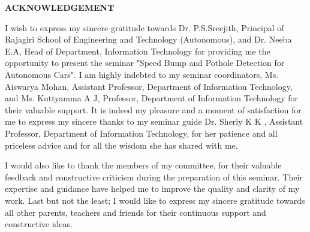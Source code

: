 \setsansfont[Ligatures=TeX]{Arial}

\begin{center}
    
    \textsf{\Huge \textbf{ACKNOWLEDGEMENT}
    }\\
    
\end{center}
\noindent
I wish to express my sincere gratitude towards Dr. P.S.Sreejith, Principal of Rajagiri School of Engineering and Technology (Autonomous), and Dr. Neeba E.A, Head of Department, Information Technology for providing me the opportunity to present the seminar "Speed Bump and Pothole Detection for Autonomous Cars". I am highly indebted to my seminar coordinators, Ms. Aiswarya Mohan, Assistant Professor, Department of Information Technology, and Ms. Kuttyamma A J,  Professor, Department of Information Technology for their valuable support. It is indeed my pleasure and a moment of satisfaction for me to express my sincere thanks to my seminar guide Dr. Sherly K K , Assistant Professor, Department of Information Technology, for her patience and all priceless advice and for all the wisdom she has shared with me. 
\par \noindent
I would also like to thank the members of my committee, for their valuable feedback and constructive criticism during the preparation of this seminar. Their expertise and guidance have helped me to improve the quality and clarity of my work.
Last but not the least; I would like to express my sincere gratitude towards all other parents, teachers and friends for their continuous support and constructive ideas.